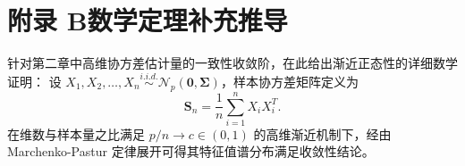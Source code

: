 \section*{附录 B\quad 数学定理补充推导}

针对第二章中高维协方差估计量的一致性收敛阶，在此给出渐近正态性的详细数学证明：
设 $X_1, X_2, \ldots, X_n \overset{i.i.d.}{\sim} \mathcal{N}_p(\boldsymbol{0}, \boldsymbol{\Sigma})$，样本协方差矩阵定义为
\[
\mathbf{S}_n = \frac{1}{n}\sum_{i=1}^n X_i X_i^T.
\]
在维数与样本量之比满足 $p/n \to c \in (0, 1)$ 的高维渐近机制下，经由 Marchenko-Pastur 定律展开可得其特征值谱分布满足收敛性结论。
